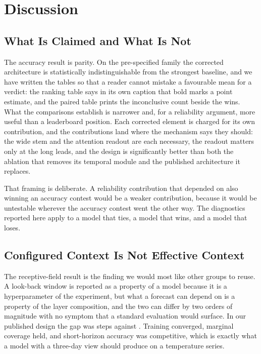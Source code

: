 \section{Discussion}
\label{sec:discussion}

\subsection{What Is Claimed and What Is Not}
The accuracy result is parity. On the pre-specified family the corrected architecture is statistically indistinguishable from the strongest baseline, and we have written the tables so that a reader cannot mistake a favourable mean for a verdict: the ranking table says in its own caption that bold marks a point estimate, and the paired table prints the inconclusive count beside the wins. What the comparisons establish is narrower and, for a reliability argument, more useful than a leaderboard position. Each corrected element is charged for its own contribution, and the contributions land where the mechanism says they should: the wide stem and the attention readout are each necessary, the readout matters only at the long leads, and the design is significantly better than both the ablation that removes its temporal module and the published architecture it replaces.

That framing is deliberate. A reliability contribution that depended on also winning an accuracy contest would be a weaker contribution, because it would be untestable wherever the accuracy contest went the other way. The diagnostics reported here apply to a model that ties, a model that wins, and a model that loses.

\subsection{Configured Context Is Not Effective Context}
The receptive-field result is the finding we would most like other groups to reuse. A look-back window is reported as a property of a model because it is a hyperparameter of the experiment, but what a forecast can depend on is a property of the layer composition, and the two can differ by two orders of magnitude with no symptom that a standard evaluation would surface. In our published design the gap was \robustFieldPublished{} steps against \robustHistory{}. Training converged, marginal coverage held, and short-horizon accuracy was competitive, which is exactly what a model with a three-day view should produce on a temperature series.

